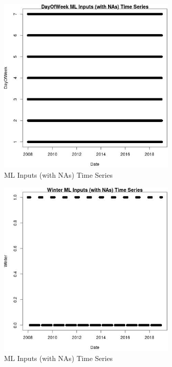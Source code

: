 \begin{figure} 
\centering  
\includegraphics[width=0.77\textwidth]{Code_Outputs/Report_ML_input_PM25_Step4_part_f_de_duplicated_aves_prioritize_24hr_obswNAs_DayOfWeekvDate.jpg} 
\caption{\label{fig:Report_ML_input_PM25_Step4_part_f_de_duplicated_aves_prioritize_24hr_obswNAsDayOfWeekvDate}ML Inputs (with NAs) Time Series} 
\end{figure} 
 

\begin{figure} 
\centering  
\includegraphics[width=0.77\textwidth]{Code_Outputs/Report_ML_input_PM25_Step4_part_f_de_duplicated_aves_prioritize_24hr_obswNAs_WintervDate.jpg} 
\caption{\label{fig:Report_ML_input_PM25_Step4_part_f_de_duplicated_aves_prioritize_24hr_obswNAsWintervDate}ML Inputs (with NAs) Time Series} 
\end{figure} 
 

